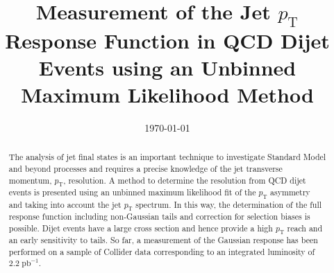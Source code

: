 \documentclass[a4paper]{cmspaper} %
\begin{document}
\begin{titlepage}
  \date{\today}
  \title{Measurement of the Jet $p_{\text{T}}$ Response Function in QCD Dijet
    Events using an Unbinned Maximum Likelihood Method}
  \begin{abstract}
    The analysis of jet final states is an important technique to investigate
    Standard Model and beyond processes and requires a precise
    knowledge of the jet transverse momentum, $p_{\text{T}}$, resolution.	
    A method to determine the resolution from QCD dijet
    events is presented using an unbinned maximum
    likelihood fit of the $p_{\text{T}}$ asymmetry and taking into account the jet $p_{\text{T}}$ spectrum.
    In this way, the determination of the full response function including non-Gaussian
    tails and correction for selection biases is possible.
    Dijet events have a large cross section and hence provide a
    high $p_{\text{T}}$ reach and an early sensitivity to tails.
    So far, a measurement of the Gaussian response has been performed
    on a sample of Collider data corresponding to an integrated luminosity of $2.2\;\text{pb}^{-1}$.
  \end{abstract}
\end{titlepage}
\tableofcontents












\end{document}
